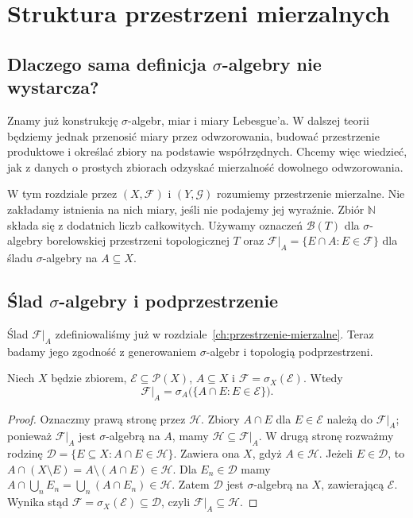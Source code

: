 \chapter{Struktura przestrzeni mierzalnych}
\label{ch:struktura-przestrzeni}

\providecommand{\atlasref}[2]{#2}


\section{Dlaczego sama definicja \texorpdfstring{$\sigma$}{sigma}-algebry nie wystarcza?}

Znamy już konstrukcję $\sigma$-algebr, miar i miary Lebesgue'a.
W dalszej teorii będziemy jednak przenosić miary przez odwzorowania,
budować przestrzenie produktowe i określać zbiory na podstawie
współrzędnych. Chcemy więc wiedzieć, jak z danych o prostych
zbiorach odzyskać mierzalność dowolnego odwzorowania.

W tym rozdziale przez $(X,\mathcal F)$ i $(Y,\mathcal G)$ rozumiemy
przestrzenie mierzalne. Nie zakładamy istnienia na nich miary,
jeśli nie podajemy jej wyraźnie. Zbiór $\mathbb N$ składa się z
dodatnich liczb całkowitych. Używamy oznaczeń
$\mathcal B(T)$ dla $\sigma$-algebry borelowskiej przestrzeni
topologicznej $T$ oraz $\mathcal F|_A=\{E\cap A:E\in\mathcal F\}$
dla śladu $\sigma$-algebry na $A\subseteq X$.

\section{Ślad \texorpdfstring{$\sigma$}{sigma}-algebry i podprzestrzenie}

Ślad $\mathcal F|_A$ zdefiniowaliśmy już w rozdziale~\ref{ch:przestrzenie-mierzalne}.
Teraz badamy jego zgodność z generowaniem $\sigma$-algebr
i topologią podprzestrzeni.


\begin{lemat}
\label{lem:trace-generation}
Niech $X$ będzie zbiorem, $\mathcal E\subseteq\mathcal P(X)$,
$A\subseteq X$ i $\mathcal F=\sigma_X(\mathcal E)$.
Wtedy
\[
\mathcal F|_A=\sigma_A\bigl(\{A\cap E:E\in\mathcal E\}\bigr).
\]
\end{lemat}
\begin{proof}
Oznaczmy prawą stronę przez $\mathcal H$. Zbiory
$A\cap E$ dla $E\in\mathcal E$ należą do $\mathcal F|_A$;
ponieważ $\mathcal F|_A$ jest $\sigma$-algebrą na $A$,
mamy $\mathcal H\subseteq\mathcal F|_A$.
W drugą stronę rozważmy rodzinę
$\mathcal D=\{E\subseteq X:A\cap E\in\mathcal H\}$.
Zawiera ona $X$, gdyż $A\in\mathcal H$. Jeżeli
$E\in\mathcal D$, to
$A\cap(X\setminus E)=A\setminus(A\cap E)\in\mathcal H$.
Dla $E_n\in\mathcal D$ mamy
$A\cap\bigcup_nE_n=\bigcup_n(A\cap E_n)\in\mathcal H$.
Zatem $\mathcal D$ jest $\sigma$-algebrą na $X$, zawierającą
$\mathcal E$. Wynika stąd
$\mathcal F=\sigma_X(\mathcal E)\subseteq\mathcal D$, czyli
$\mathcal F|_A\subseteq\mathcal H$.
\end{proof}

